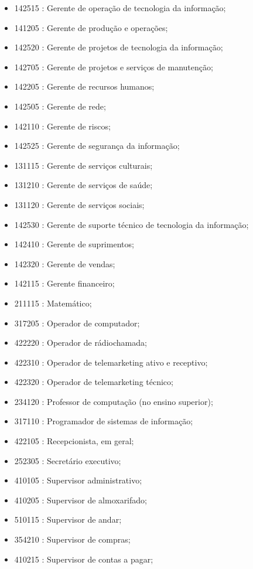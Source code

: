 \begin{itemize}
\begin{itemize}
\begin{itemize}
      \item 142515 : Gerente de operação de tecnologia da informação;
      \item 141205 : Gerente de produção e operações;
      \item 142520 : Gerente de projetos de tecnologia da informação;
      \item 142705 : Gerente de projetos e serviços de manutenção;
      \item 142205 : Gerente de recursos humanos;
      \item 142505 : Gerente de rede;
      \item 142110 : Gerente de riscos;
      \item 142525 : Gerente de segurança da informação;
      \item 131115 : Gerente de serviços culturais;
      \item 131210 : Gerente de serviços de saúde;
      \item 131120 : Gerente de serviços sociais;
      \item 142530 : Gerente de suporte técnico de tecnologia da informação;
      \item 142410 : Gerente de suprimentos;
      \item 142320 : Gerente de vendas;
      \item 142115 : Gerente financeiro;
      \item 211115 : Matemático;
      \item 317205 : Operador de computador;
      \item 422220 : Operador de rádiochamada;
      \item 422310 : Operador de telemarketing ativo e receptivo;
      \item 422320 : Operador de telemarketing técnico;
      \item 234120 : Professor de computação (no ensino superior);
      \item 317110 : Programador de sistemas de informação;
      \item 422105 : Recepcionista, em geral;
      \item 252305 : Secretário executivo;
      \item 410105 : Supervisor administrativo;
      \item 410205 : Supervisor de almoxarifado;
      \item 510115 : Supervisor de andar;
      \item 354210 : Supervisor de compras;
      \item 410215 : Supervisor de contas a pagar;

\end{itemize}
\end{itemize}
\end{itemize}
